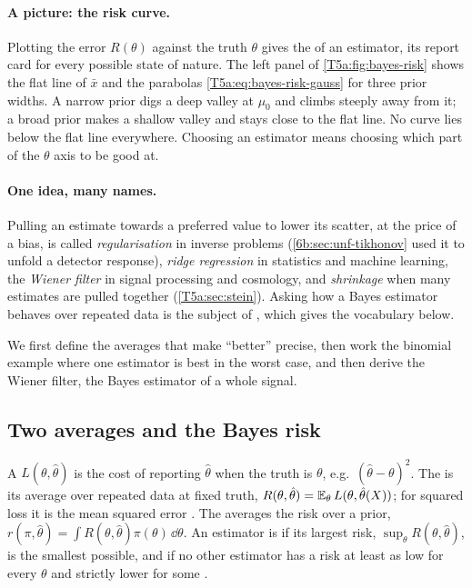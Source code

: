 \paragraph{A picture: the risk curve.}
Plotting the error $R(\theta)$ against the truth $\theta$ gives the
 of an estimator, its report card for every possible
state of nature. The left panel of \cref{T5a:fig:bayes-risk} shows the flat
line of $\bar x$ and the parabolas \eqref{T5a:eq:bayes-risk-gauss} for three
prior widths. A narrow prior digs a deep valley at $\mu_0$ and climbs
steeply away from it; a broad prior makes a shallow valley and stays close
to the flat line. No curve lies below the flat line everywhere. Choosing an
estimator means choosing which part of the $\theta$ axis to be good at.

\paragraph{One idea, many names.}
Pulling an estimate towards a preferred value to lower its scatter, at the
price of a bias, is called \emph{regularisation} in inverse problems
(\cref{6b:sec:unf-tikhonov} used it to unfold a detector response),
\emph{ridge regression} in statistics and machine learning, the \emph{Wiener
filter} in signal processing and cosmology, and \emph{shrinkage} when many
estimates are pulled together (\cref{T5a:sec:stein}). Asking how a Bayes
estimator behaves over repeated data is the subject of  , which gives the vocabulary below.

We first define the averages that make ``better'' precise, then work the
binomial example where one estimator is best in the worst case, and then
derive the Wiener filter, the Bayes estimator of a whole signal.

\subsection{Two averages and the Bayes risk}
\label{T5a:sec:two-averages}

\begin{workdef}
A  $L(\theta,\hat\theta)$ is the cost of reporting $\hat\theta$
when the truth is $\theta$, e.g.\ $(\hat\theta-\theta)^2$. The
 is its average over repeated data at fixed truth,
$R(\theta,\hat\theta)=\E_\theta L(\theta,\hat\theta(X))$; for squared loss it
is the mean squared error . The 
averages the risk over a prior, $r(\pi,\hat\theta)=\int R(\theta,\hat\theta)\pi(\theta)\,\dd\theta$.
An estimator is  if its largest risk,
$\sup_\theta R(\theta,\hat\theta)$, is the smallest possible, and
 if no other estimator has a risk at least as low for
every $\theta$ and strictly lower for some  .
\end{workdef}

